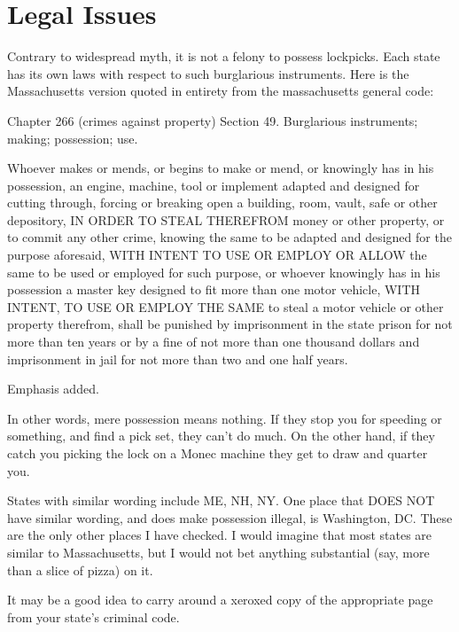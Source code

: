 \appendix
\chapter{Legal Issues}

Contrary to widespread myth, it is not a felony to possess lockpicks. Each state has its own 
laws with respect to such burglarious instruments. Here is the Massachusetts version quoted 
in entirety from the massachusetts general code: 


Chapter 266 (crimes against property) 
Section 49. Burglarious instruments; making; possession; use. 

Whoever makes or mends, or begins to make or mend, or knowingly has in 
his possession, an engine, machine, tool or implement adapted and designed for 
cutting through, forcing or breaking open a building, room, vault, safe or other 
depository, IN ORDER TO STEAL THEREFROM money or other property, or 
to commit any other crime, knowing the same to be adapted and designed for 
the purpose aforesaid, WITH INTENT TO USE OR EMPLOY OR ALLOW 
the same to be used or employed for such purpose, or whoever knowingly has in 
his possession a master key designed to fit more than one motor vehicle, WITH 
INTENT, TO USE OR EMPLOY THE SAME to steal a motor vehicle or other 
property therefrom, shall be punished by imprisonment in the state prison for 
not more than ten years or by a fine of not more than one thousand dollars and 
imprisonment in jail for not more than two and one half years. 

Emphasis added. 

In other words, mere possession means nothing. If they stop you for speeding or something, 
and find a pick set, they can't do much. On the other hand, if they catch you picking 
the lock on a Monec machine they get to draw and quarter you. 

States with similar wording include ME, NH, NY. One place that DOES NOT have 
similar wording, and does make possession illegal, is Washington, DC. These are the only 
other places I have checked. I would imagine that most states are similar to Massachusetts, 
but I would not bet anything substantial (say, more than a slice of pizza) on it. 

It may be a good idea to carry around a xeroxed copy of the appropriate page from your 
state's criminal code.
